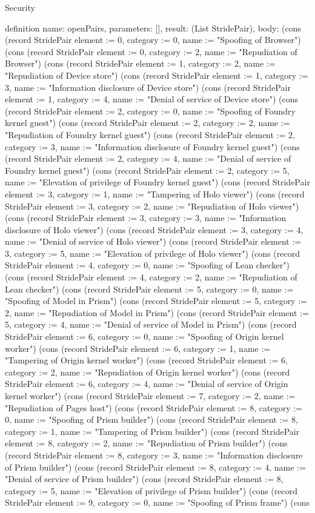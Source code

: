 \begin{lexlean}{Security}
\begin{semanticmodule}
definition{
  name: openPairs,
  parameters: [],
  result: (List StridePair),
  body: (cons (record StridePair {element := 0, category := 0, name := "Spoofing of Browser"}) (cons (record StridePair {element := 0, category := 2, name := "Repudiation of Browser"}) (cons (record StridePair {element := 1, category := 2, name := "Repudiation of Device store"}) (cons (record StridePair {element := 1, category := 3, name := "Information disclosure of Device store"}) (cons (record StridePair {element := 1, category := 4, name := "Denial of service of Device store"}) (cons (record StridePair {element := 2, category := 0, name := "Spoofing of Foundry kernel guest"}) (cons (record StridePair {element := 2, category := 2, name := "Repudiation of Foundry kernel guest"}) (cons (record StridePair {element := 2, category := 3, name := "Information disclosure of Foundry kernel guest"}) (cons (record StridePair {element := 2, category := 4, name := "Denial of service of Foundry kernel guest"}) (cons (record StridePair {element := 2, category := 5, name := "Elevation of privilege of Foundry kernel guest"}) (cons (record StridePair {element := 3, category := 1, name := "Tampering of Holo viewer"}) (cons (record StridePair {element := 3, category := 2, name := "Repudiation of Holo viewer"}) (cons (record StridePair {element := 3, category := 3, name := "Information disclosure of Holo viewer"}) (cons (record StridePair {element := 3, category := 4, name := "Denial of service of Holo viewer"}) (cons (record StridePair {element := 3, category := 5, name := "Elevation of privilege of Holo viewer"}) (cons (record StridePair {element := 4, category := 0, name := "Spoofing of Lean checker"}) (cons (record StridePair {element := 4, category := 2, name := "Repudiation of Lean checker"}) (cons (record StridePair {element := 5, category := 0, name := "Spoofing of Model in Prism"}) (cons (record StridePair {element := 5, category := 2, name := "Repudiation of Model in Prism"}) (cons (record StridePair {element := 5, category := 4, name := "Denial of service of Model in Prism"}) (cons (record StridePair {element := 6, category := 0, name := "Spoofing of Origin kernel worker"}) (cons (record StridePair {element := 6, category := 1, name := "Tampering of Origin kernel worker"}) (cons (record StridePair {element := 6, category := 2, name := "Repudiation of Origin kernel worker"}) (cons (record StridePair {element := 6, category := 4, name := "Denial of service of Origin kernel worker"}) (cons (record StridePair {element := 7, category := 2, name := "Repudiation of Pages host"}) (cons (record StridePair {element := 8, category := 0, name := "Spoofing of Prism builder"}) (cons (record StridePair {element := 8, category := 1, name := "Tampering of Prism builder"}) (cons (record StridePair {element := 8, category := 2, name := "Repudiation of Prism builder"}) (cons (record StridePair {element := 8, category := 3, name := "Information disclosure of Prism builder"}) (cons (record StridePair {element := 8, category := 4, name := "Denial of service of Prism builder"}) (cons (record StridePair {element := 8, category := 5, name := "Elevation of privilege of Prism builder"}) (cons (record StridePair {element := 9, category := 0, name := "Spoofing of Prism frame"}) (cons }
\end{semanticmodule}
\end{lexlean}
